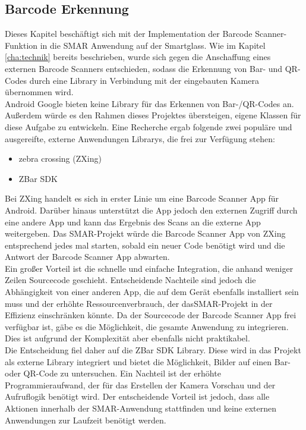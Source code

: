 \subsection{Barcode Erkennung}
\label{sec:barcode}
Dieses Kapitel beschäftigt sich mit der Implementation der Barcode Scanner-Funktion in die \ac{SMAR} Anwendung auf der Smartglass. Wie im Kapitel \ref{cha:technik}  bereits beschrieben, wurde sich gegen die Anschaffung eines externen Barcode Scanners entschieden, sodass die Erkennung von Bar- und QR-Codes durch eine Library in Verbindung mit der eingebauten Kamera übernommen wird.\\

Android \bzw Google bieten keine Library für das Erkennen von Bar-/QR-Codes an. Außerdem würde es den Rahmen dieses Projektes übersteigen, eigene Klassen für diese Aufgabe zu entwickeln. Eine Recherche ergab folgende zwei populäre und ausgereifte, externe Anwendungen \bzw Librarys, die frei zur Verfügung stehen:
\begin{itemize}
	\item zebra crossing (ZXing)
	\item ZBar SDK
\end{itemize}
Bei ZXing handelt es sich in erster Linie um eine Barcode Scanner App für Android. Darüber hinaus unterstützt die App jedoch den externen Zugriff durch eine andere App und kann das Ergebnis des Scans an die externe App weitergeben. Das \ac{SMAR}-Projekt würde die Barcode Scanner App von ZXing entsprechend jedes mal starten, sobald ein neuer Code benötigt wird und die Antwort der Barcode Scanner App abwarten.\\
Ein großer Vorteil ist die schnelle und einfache Integration, die anhand weniger Zeilen Sourcecode geschieht. Entscheidende Nachteile sind jedoch die Abhängigkeit von einer anderen App, die auf dem Gerät ebenfalls installiert sein muss und der erhöhte Ressourcenverbrauch, der das\ac{SMAR}-Projekt in der Effizienz einschränken könnte. Da der Sourcecode der Barcode Scanner App frei verfügbar ist, gäbe es die Möglichkeit, die gesamte Anwendung zu integrieren. Dies ist aufgrund der Komplexität aber ebenfalls nicht praktikabel.\\

Die Entscheidung fiel daher auf die ZBar SDK Library. Diese wird in das Projekt als externe Library integriert und bietet die Möglichkeit, Bilder auf einen Bar- oder QR-Code zu untersuchen. Ein Nachteil ist der erhöhte Programmieraufwand, der für das Erstellen der Kamera Vorschau und der Aufruflogik benötigt wird. Der entscheidende Vorteil ist jedoch, dass alle Aktionen innerhalb der \ac{SMAR}-Anwendung stattfinden und keine externen Anwendungen zur Laufzeit benötigt werden.\\

